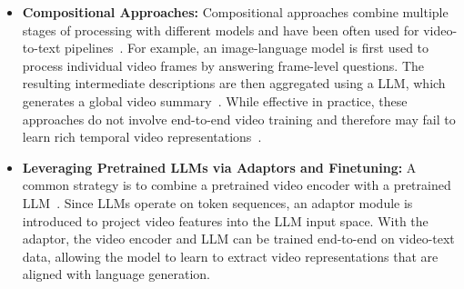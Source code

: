 \begin{itemize}

    \item \textbf{Compositional Approaches:} Compositional approaches combine multiple stages of processing with different models and have been often used for video-to-text pipelines~\cite{Zeng2022SocraticMC, Chen2023VideoCT, Shang2024TraveLERAM, li2023composing}. 
    For example, an image-language model is first used to process individual video frames by answering frame-level questions. The resulting intermediate descriptions are then aggregated using a \ac{LLM}, which generates a global video summary~\cite{Chen2023VideoCT}. While effective in practice, these approaches do not involve end-to-end video training and therefore may fail to learn rich temporal video representations~\cite{McCarthy_2025}.

    \item \textbf{Leveraging Pretrained LLMs via Adaptors and Finetuning:}
    A common strategy is to combine a pretrained video encoder with a pretrained \ac{LLM}~\cite{Lin2023VideoLLaVALU, Maaz2023VideoChatGPTTD, Papalampidi2023ASR, Zhang2023VideoLLaMAAI}. Since \acp{LLM} operate on token sequences, an adaptor module is introduced to project video features into the \ac{LLM} input space. With the adaptor, the video encoder and \ac{LLM} can be trained end-to-end on video-text data, allowing the model to learn to extract video representations that are aligned with language generation.



\end{itemize}
